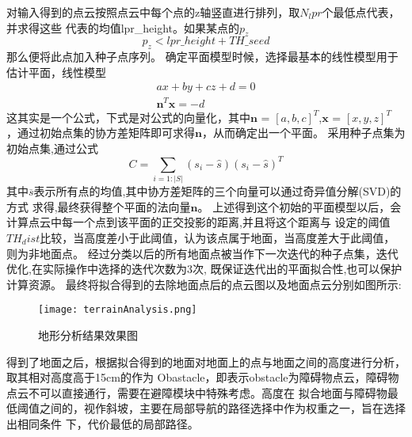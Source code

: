 对输入得到的点云按照点云中每个点的z轴竖直进行排列，取$N_lpr$个最低点代表，并求得这些
代表的均值lpr\_height。如果某点的$p_z$
\begin{equation}
    p_z  < lpr\_height + TH\_seed 
\end{equation}
那么便将此点加入种子点序列。
确定平面模型时候，选择最基本的线性模型用于估计平面，线性模型
\begin{equation}
    \begin{aligned}
    a x+b y+c z+d=0\\
    \symbf{n}^{T} \mathbf{x}=-d 
    \end{aligned}   
\end{equation}
这其实是一个公式，下式是对公式的向量化，其中$\symbf{n}$ = $[a,b,c]^T$,$\symbf{x}$ = $[x,y,z]^T$
，通过初始点集的协方差矩阵即可求得$\symbf{n}$，从而确定出一个平面。
采用种子点集为初始点集,通过公式
\begin{equation}
    C=\sum_{i=1:|S|}\left(s_{i}-\hat{s}\right)\left(s_{i}-\hat{s}\right)^{T}
\end{equation}
其中$\overline{s}$表示所有点的均值,其中协方差矩阵的三个向量可以通过奇异值分解(SVD)的方式
求得,最终获得整个平面的法向量$\symbf{n}$。
上述得到这个初始的平面模型以后，会计算点云中每一个点到该平面的正交投影的距离,并且将这个距离与
设定的阈值$TH_dist$比较，当高度差小于此阈值，认为该点属于地面，当高度差大于此阈值，则为非地面点。
经过分类以后的所有地面点被当作下一次迭代的种子点集，迭代优化,在实际操作中选择的迭代次数为3次,
既保证迭代出的平面拟合性,也可以保护计算资源。
最终将拟合得到的去除地面点后的点云图以及地面点云分别如图所示:
\begin{figure}[ht]
    \centering
    \texttt{[image: terrainAnalysis.png]}
    \caption{地形分析结果效果图}
\end{figure}

得到了地面之后，根据拟合得到的地面对地面上的点与地面之间的高度进行分析，取其相对高度高于15cm的作为
Obastacle，即表示obstacle为障碍物点云，障碍物点云不可以直接通行，需要在避障模块中特殊考虑。高度在
拟合地面与障碍物最低阈值之间的，视作斜坡，主要在局部导航的路径选择中作为权重之一，旨在选择出相同条件
下，代价最低的局部路径。




